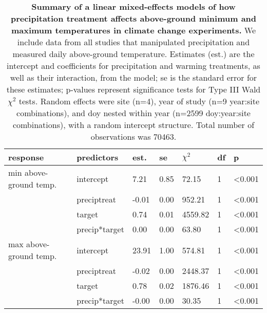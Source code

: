 \documentclass{article}
\begin{document}
\begin{table}[ht]
\centering
\caption{\textbf{Summary of a linear mixed-effects models of how precipitation treatment affects above-ground minimum and maximum temperatures in climate change experiments.} We include data from all studies that manipulated precipitation and measured daily above-ground temperature. Estimates (est.) are the intercept and coefficients for precipitation and warming treatments, as well as their interaction, from the model; se is the standard error for these estimates; p-values represent significance tests for Type III Wald $\chi^{2}$ tests. Random effects were site (n=4), year of study (n=9 year:site combinations), and doy nested within year (n=2599 doy:year:site combinations), with a random intercept structure. Total number of observations was 70463.} 
\label{table:preciptemp}
\begingroup\footnotesize
\begin{tabular}{|p{}|p{}|p{}|p{}|p{}|p{}|p{}|}
  \hline
response & predictors & est. & se & $\chi^{2}$ & df & p \\ 
  \hline
min above-ground temp. & intercept & 7.21 & 0.85 & 72.15 & 1 & <0.001 \\ 
   & preciptreat & -0.01 & 0.00 & 952.21 & 1 & <0.001 \\ 
   & target & 0.74 & 0.01 & 4559.82 & 1 & <0.001 \\ 
   & precip*target & 0.00 & 0.00 & 63.80 & 1 & <0.001 \\ 
   \hline
max above-ground temp. & intercept & 23.91 & 1.00 & 574.81 & 1 & <0.001 \\ 
   & preciptreat & -0.02 & 0.00 & 2448.37 & 1 & <0.001 \\ 
   & target & 0.78 & 0.02 & 1876.46 & 1 & <0.001 \\ 
   & precip*target & -0.00 & 0.00 & 30.35 & 1 & <0.001 \\ 
   \hline
\end{tabular}
\endgroup
\end{table}
\end{document}
